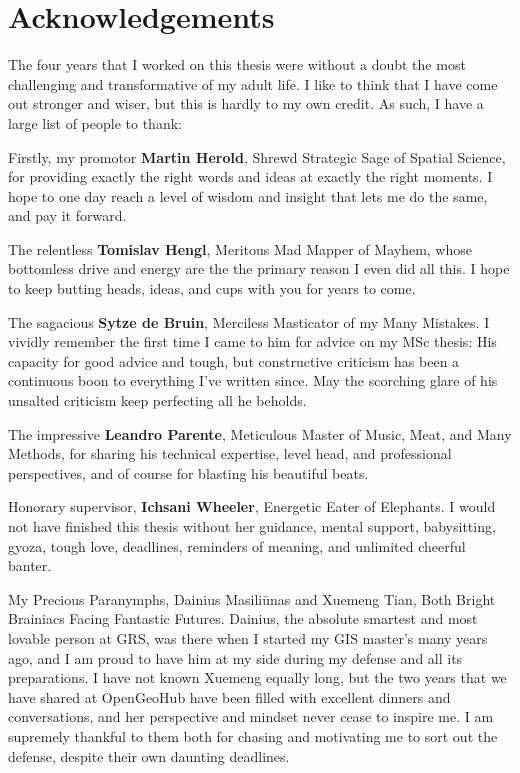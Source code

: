 \chapter{Acknowledgements}

The four years that I worked on this thesis were without a doubt the most challenging and transformative of my adult life. I like to think that I have come out stronger and wiser, but this is hardly to my own credit. As such, I have a large list of people to thank:

Firstly, my promotor \textbf{Martin Herold}, Shrewd Strategic Sage of Spatial Science, for providing exactly the right words and ideas at exactly the right moments. I hope to one day reach a level of wisdom and insight that lets me do the same, and pay it forward.

The relentless \textbf{Tomislav Hengl}, Meritous Mad Mapper of Mayhem, whose bottomless drive and energy are the the primary reason I even did all this. I hope to keep butting heads, ideas, and cups with you for years to come.

The sagacious \textbf{Sytze de Bruin}, Merciless Masticator of my Many Mistakes. I vividly remember the first time I came to him for advice on my MSc thesis: His capacity for good advice and tough, but constructive criticism has been a continuous boon to everything I've written since. May the scorching glare of his unsalted criticism keep perfecting all he beholds.

The impressive \textbf{Leandro Parente}, Meticulous Master of Music, Meat, and Many Methods, for sharing his technical expertise, level head, and professional perspectives, and of course for blasting his beautiful beats.

Honorary supervisor, \textbf{Ichsani Wheeler}, Energetic Eater of Elephants. I would not have finished this thesis without her guidance, mental support, babysitting, gyoza, tough love, deadlines, reminders of meaning, and unlimited cheerful banter.

My Precious Paranymphs, Dainius Masili\={u}nas and Xuemeng Tian, Both Bright Brainiacs Facing Fantastic Futures. Dainius, the absolute smartest and most lovable person at GRS, was there when I started my GIS master's many years ago, and I am proud to have him at my side during my defense and all its preparations. I have not known Xuemeng equally long, but the two years that we have shared at OpenGeoHub have been filled with excellent dinners and conversations, and her perspective and mindset never cease to inspire me. I am supremely thankful to them both for chasing and motivating me to sort out the defense, despite their own daunting deadlines.

